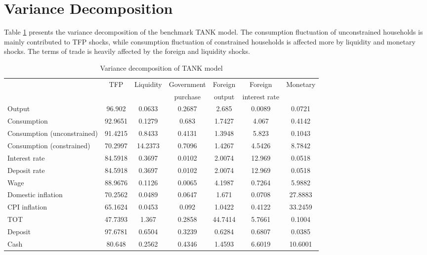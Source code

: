 \documentclass[12pt]{article}
\begin{document}
      
\clearpage
\section{Variance Decomposition}
Table \ref{variance} presents the variance decomposition of the benchmark TANK model. The consumption fluctuation of unconstrained households is mainly contributed to TFP shocks, while consumption fluctuation of constrained households is affected more by liquidity and monetary shocks. The terms of trade is heavily affected by the foreign and liquidity shocks.
\begin{table}[h!]
\centering 
\scriptsize
\begin{tabular}{lcccccc}
\hline \hline
                                    & TFP     & Liquidity & Government  & Foreign & Foreign & Monetary \\
                                    &     &  & purchase &  output & interest rate &  \\\hline
Output                      & 96.902  & 0.0633  & 0.2687 & 2.685   & 0.0089 & 0.0721  \\
Consumption                 & 92.9651 & 0.1279  & 0.683  & 1.7427  & 4.067  & 0.4142  \\
Consumption (unconstrained) & 91.4215 & 0.8433  & 0.4131 & 1.3948  & 5.823  & 0.1043  \\
Consumption (constrained)   & 70.2997 & 14.2373 & 0.7096 & 1.4267  & 4.5426 & 8.7842  \\
Interest rate               & 84.5918 & 0.3697  & 0.0102 & 2.0074  & 12.969 & 0.0518  \\
Deposit rate                & 84.5918 & 0.3697  & 0.0102 & 2.0074  & 12.969 & 0.0518  \\
Wage                        & 88.9676 & 0.1126  & 0.0065 & 4.1987  & 0.7264 & 5.9882  \\
Domestic inflation          & 70.2562 & 0.0489  & 0.0647 & 1.671   & 0.0708 & 27.8883 \\
CPI inflation           & 65.1624 & 0.0453  & 0.092  & 1.0422  & 0.4122 & 33.2459 \\
TOT                         & 47.7393 & 1.367   & 0.2858 & 44.7414 & 5.7661 & 0.1004  \\
Deposit                     & 97.6781 & 0.6504  & 0.3239 & 0.6284  & 0.6807 & 0.0385  \\
Cash                        & 80.648  & 0.2562  & 0.4346 & 1.4593  & 6.6019 & 10.6001 \\\hline
\end{tabular}
\caption{Variance decomposition of TANK model}
\label{variance}
\end{table}
\end{document}
